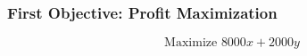 \subsubsection{First Objective: Profit Maximization}
%
\[
\]
\[
\text{Maximize } 8000x + 2000y
\]
\[
\]
%
\[
\]
\[
\]
\[
\begin{aligned}
\end{aligned}
\]
%
